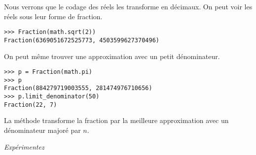 Nous verrons que le codage des réels les transforme en décimaux. On peut voir les réels sous leur forme de fraction.

\begin{lstlisting}
>>> Fraction(math.sqrt(2))
Fraction(6369051672525773, 4503599627370496)
\end{lstlisting}

On peut même trouver une approximation avec un petit dénominateur.

\begin{lstlisting}
>>> p = Fraction(math.pi)
>>> p
Fraction(884279719003555, 281474976710656)
>>> p.limit_denominator(50)
Fraction(22, 7)
\end{lstlisting}

La méthode  transforme la fraction par la meilleure approximation avec un dénominateur majoré par $n$.

\begin{Exercise}
{\it Expérimentez}
\end{Exercise}
